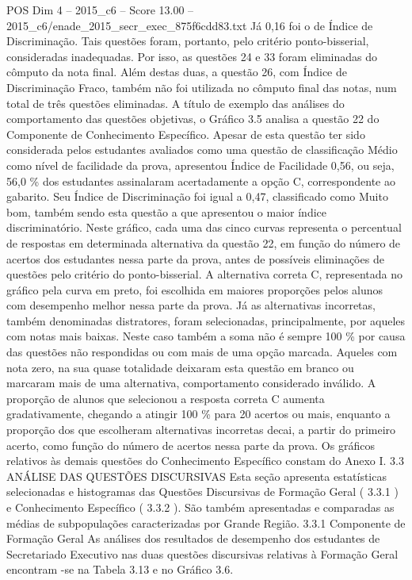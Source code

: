 \begin{textsample}{POS Dim 4 – 2015\_c6 – Score 13.00 – 2015\_c6/enade\_2015\_secr\_exec\_875f6cdd83.txt}
Já 0,16 foi o de Índice de Discriminação.
Tais questões foram, portanto, pelo critério ponto-bisserial, consideradas inadequadas.
Por isso, as questões 24 e 33 foram eliminadas do cômputo da nota final.
Além destas duas, a questão 26, com Índice de Discriminação Fraco, também não foi utilizada no cômputo final das notas, num total de três questões eliminadas.
A título de exemplo das análises do comportamento das questões objetivas, o Gráfico 3.5 analisa a questão 22 do Componente de Conhecimento Específico.
Apesar de esta questão ter sido considerada pelos estudantes avaliados como uma questão de classificação Médio como nível de facilidade da prova, apresentou Índice de Facilidade 0,56, ou seja, 56,0 \% dos estudantes assinalaram acertadamente a opção C, correspondente ao gabarito.
Seu Índice de Discriminação foi igual a 0,47, classificado como Muito bom, também sendo esta questão a que apresentou o maior índice discriminatório.
Neste gráfico, cada uma das cinco curvas representa o percentual de respostas em determinada alternativa da questão 22, em função do número de acertos dos estudantes nessa parte da prova, antes de possíveis eliminações de questões pelo critério do ponto-bisserial.
A alternativa correta C, representada no gráfico pela curva em preto, foi escolhida em maiores proporções pelos alunos com desempenho melhor nessa parte da prova.
Já as alternativas incorretas, também denominadas distratores, foram selecionadas, principalmente, por aqueles com notas mais baixas.
Neste caso também a soma não é sempre 100 \% por causa das questões não respondidas ou com mais de uma opção marcada.
Aqueles com nota zero, na sua quase totalidade deixaram esta questão em branco ou marcaram mais de uma alternativa, comportamento considerado inválido.
A proporção de alunos que selecionou a resposta correta C aumenta gradativamente, chegando a atingir 100 \% para 20 acertos ou mais, enquanto a proporção dos que escolheram alternativas incorretas decai, a partir do primeiro acerto, como função do número de acertos nessa parte da prova.
Os gráficos relativos às demais questões do Conhecimento Específico constam do Anexo I. 3.3 ANÁLISE DAS QUESTÕES DISCURSIVAS Esta seção apresenta estatísticas selecionadas e histogramas das Questões Discursivas de Formação Geral ( 3.3.1 ) e Conhecimento Específico ( 3.3.2 ).
São também apresentadas e comparadas as médias de subpopulações caracterizadas por Grande Região. 3.3.1 Componente de Formação Geral As análises dos resultados de desempenho dos estudantes de Secretariado Executivo nas duas questões discursivas relativas à Formação Geral encontram -se na Tabela 3.13 e no Gráfico 3.6.

\end{textsample}
